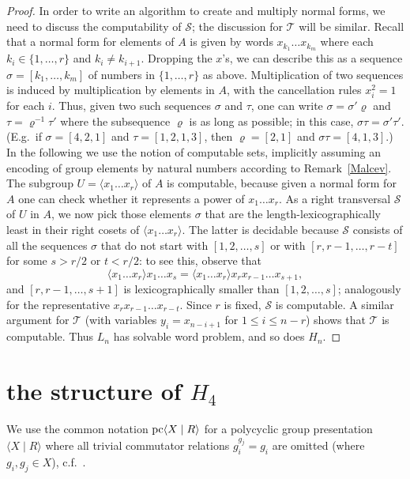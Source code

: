 \documentclass[11pt]{amsart}
\theoremstyle{mythm}
\theoremstyle{mydef}
\theoremstyle{myrem}
\numberwithin{equation}{section}
\newcommand{\la}{\langle}
\newcommand{\ra}{\rangle}
\newcommand{\sss}{\sigma}
\begin{document}
\begin{proof}
In order to   write an algorithm to create and multiply normal forms, we need to discuss the computability of $\mathcal{S}$; the discussion for $\mathcal{T}$ will be similar.  Recall that a  normal form for elements of $A$ is given by words $x_{k_1} \ldots x_{k_m}$ where each $k_i \in \{1, \ldots, r\}$ and $k_i \neq k_{i+1}$. Dropping the $x$'s, we can describe this as a sequence $\sss=[k_1, \ldots, k_m]$ of numbers in $\{1, \ldots, r\}$ as above. Multiplication of two sequences is induced by multiplication by elements in $A$, with the cancellation rules $x_i^2=1$ for each $i$. Thus, given two such sequences $\sigma$ and $\tau$, one can write $\sigma=\sigma'\varrho$ and $\tau=\varrho^{-1}\tau'$ where the subsequence $\varrho$ is as long as possible; in this case, $\sigma\tau=\sigma'\tau'$. (E.g.\ if $\sigma=[4,2,1]$ and $\tau=[1,2,1,3]$, then $\varrho=[2,1]$ and  $\sigma\tau=[4,1,3]$.) In the following we  use the notion of computable sets, implicitly assuming an encoding of group elements by natural numbers according to Remark~\ref{Malcev}. The subgroup $U = \la x_1 \ldots x_r \ra$ of $A$  is   computable, because given a normal form for $A$ one can check whether it  represents a power of $x_1 \ldots x_r$. As   a right transversal $\mathcal{S}$ of $U$ in $A$, we now pick those elements $\sss$ that are the length-lexicographically least in their right cosets of $\la x_1 \ldots x_r\ra  $. The latter is decidable because $\mathcal{S}$ consists of  all the sequences $\sss$ that do not start with $[1, 2,\ldots, s]$ or with $[r,r-1,\ldots,r-t]$ for some $s> r/2$ or $t< r/2$: to see this, observe that  \[\langle x_1\ldots x_r\rangle x_1\ldots x_s = \langle x_1\ldots x_r\rangle x_r x_{r-1}\ldots x_{s+1},\] and $[r,r-1,\ldots,s+1]$ is lexicographically smaller than $[1,2,\ldots,s]$; analogously for the representative $x_rx_{r-1}\ldots x_{r-t}$.  Since $r$ is fixed, $\mathcal{S}$ is computable. A similar argument for $\mathcal{T}$ (with variables $y_i = x_{n-i+1}$ for $1\le i \le n-r$) shows that $\mathcal{T}$ is computable. Thus $L_n$ has solvable word problem, and  so does  $H_n$.
\end{proof}


   
\section{the structure of $H_4$}\label{sec_nut}
\noindent We use the common notation ${\rm pc}\la X\mid R\ra$ for a polycyclic group presentation $\la X\mid R\rangle$ where all trivial commutator relations $g_i^{g_j}=g_i$ are omitted (where $g_i,g_j\in X$), c.f.\ \cite[Section 8.1]{handbook}.
\end{document}
